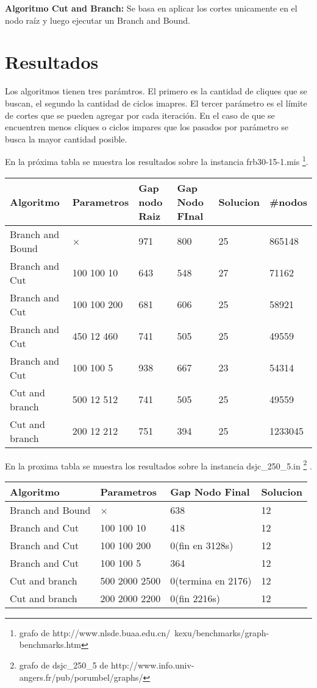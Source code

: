{\textbf{Algoritmo Cut and Branch:}
Se basa en aplicar los cortes unicamente en el nodo ra\'iz y luego ejecutar un Branch and Bound.\\

\newpage
\section{Resultados}

Los algoritmos tienen tres par\'amtros. El primero es la cantidad de cliques que se buscan, el segundo
la cantidad de ciclos imapres. El tercer par\'ametro es el l\'imite de cortes que se pueden agregar por cada 
iteraci\'on. En el caso de que se encuentren menos cliques o ciclos impares que los pasados por par\'ametro
se busca la mayor cantidad posible.

En la pr\'oxima tabla se muestra los resultados sobre la instancia frb30-15-1.mis \footnote{grafo de
http://www.nlsde.buaa.edu.cn/~kexu/benchmarks/graph-benchmarks.htm}.

\begin{center}
\begin{tabular}{|l|l|l|l|l|l|}
\hline
Algoritmo & Parametros & Gap nodo Raiz & Gap Nodo FInal & Solucion & #nodos\\ \hline
Branch and Bound & × & 971 & 800 & 25 & 865148\\ \hline
Branch and Cut & 100 100 10 & 643 & 548 & 27 & 71162\\ \hline
Branch and Cut & 100 100 200 & 681 & 606 & 25 & 58921\\ \hline
Branch and Cut & 450 12 460 & 741 & 505 & 25 & 49559\\ \hline
Branch and Cut & 100 100 5 & 938 & 667 & 23 & 54314\\ \hline
Cut and branch & 500 12 512 & 741 & 505 & 25 & 49559\\ \hline
Cut and branch & 200 12 212 & 751 & 394 & 25 & 1233045\\ \hline
\end{tabular}
\end{center}

En la proxima tabla se muestra los resultados sobre la instancia dsjc_250_5.in \footnote{grafo de dsjc\_250\_5 
de http://www.info.univ-angers.fr/pub/porumbel/graphs/} .

\begin{center}
\begin{tabular}{|l|l|l|l|}
\hline
Algoritmo & Parametros & Gap Nodo Final & Solucion\\ \hline
Branch and Bound & × & 638 & 12\\ \hline
Branch and Cut & 100 100 10 & 418 & 12\\ \hline
Branch and Cut & 100 100 200 & 0(fin en 3128s) & 12\\ \hline
Branch and Cut & 100 100 5 & 364 & 12\\ \hline
Cut and branch & 500 2000 2500 & 0(termina en 2176) & 12\\ \hline
Cut and branch & 200 2000 2200 & 0(fin 2216s) & 12\\ \hline
\end{tabular}
\end{center}


}
